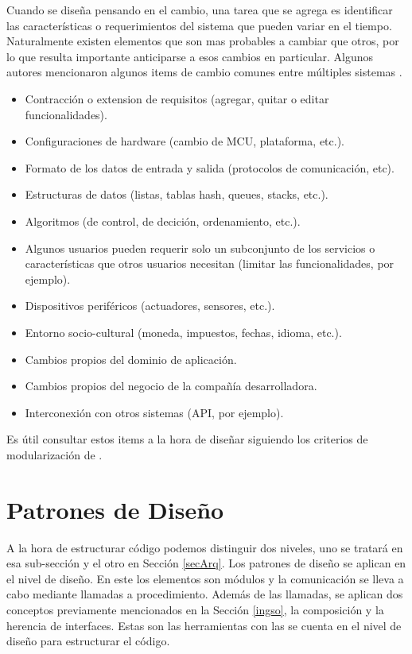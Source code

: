 Cuando se diseña pensando en el cambio, una tarea que se agrega es identificar las características o requerimientos del sistema que pueden variar en el tiempo. Naturalmente existen elementos que son mas probables a cambiar que otros, por lo que resulta importante anticiparse a esos cambios en particular. Algunos autores mencionaron algunos items de cambio comunes entre múltiples sistemas \cite{Parnas02, cristia2022diseno}.

\begin{itemize}
	\item Contracción o extension de requisitos (agregar, quitar o editar funcionalidades).
	\item Configuraciones de hardware (cambio de \gls{MCU}, plataforma, etc.).
	\item Formato de los datos de entrada y salida (protocolos de comunicación, etc).
	\item Estructuras de datos (listas, tablas hash, queues, stacks, etc.).
	\item Algoritmos (de control, de decición, ordenamiento, etc.).
	\item Algunos usuarios pueden requerir solo un subconjunto de los servicios o características que otros usuarios necesitan (limitar las funcionalidades, por ejemplo).
	\item Dispositivos periféricos (actuadores, sensores, etc.).
	\item Entorno socio-cultural (moneda, impuestos, fechas, idioma, etc.).
	\item Cambios propios del dominio de aplicación.
	\item Cambios propios del negocio de la compañía desarrolladora.
	\item Interconexión con otros sistemas (\gls{API}, por ejemplo).
\end{itemize}

Es útil consultar estos items a la hora de diseñar siguiendo los criterios de modularización de \cite{Parnas1972}.




\section{Patrones de Diseño}

A la hora de estructurar código podemos distinguir dos niveles, uno se tratará en esa sub-sección y el otro en Sección \ref{secArq}. Los patrones de diseño se aplican en el nivel de diseño. En este los elementos son módulos y la comunicación se lleva a cabo mediante llamadas a procedimiento. Además de las llamadas, se aplican dos conceptos previamente mencionados en la Sección \ref{ingso}, la composición y la herencia de interfaces. Estas son las herramientas con las se cuenta en el nivel de diseño para estructurar el código.

